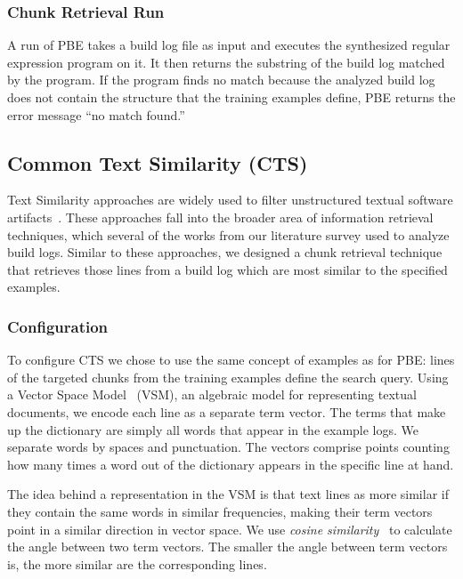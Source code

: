 \documentclass[10pt,journal,compsoc]{IEEEtran}
\begin{document}
\subsubsection{Chunk Retrieval Run}
A run of PBE takes a build log file as input and executes the
synthesized regular expression program on it.
It then returns the substring
of the build log matched by the program.
If the program finds no match because the analyzed build log
does not contain the structure that the training examples define,
PBE returns the error message ``no match found.''

\subsection{Common Text Similarity (CTS)}
Text Similarity approaches are widely used to filter unstructured
textual software artifacts~\cite{runeson2007detection,
marcus2005recovery,antoniol2002recovering,mccarey2006recommending}.
These approaches fall into the broader area of information retrieval
techniques, which several of the works from our literature survey
used to analyze build logs.
Similar to these approaches, we designed a chunk retrieval
technique that
retrieves those lines from a build log which are most
similar to the specified examples.

\subsubsection{Configuration}
To configure CTS we chose to use the same concept of examples as for
PBE: lines of the targeted chunks from the training examples define
the search query.
Using a Vector Space
Model~\cite{schutze2008introduction} (VSM), an algebraic model for
representing textual documents, we encode each line as a separate term
vector.
The terms that make up the dictionary are simply all words
that appear in the example logs.
We separate words by spaces and
punctuation.
The vectors comprise points counting
how many times a word out of the dictionary appears in the specific
line at hand.

The idea behind a representation in the VSM is that text lines as more
similar if they contain the same words in similar frequencies,
making their term vectors point in a similar direction in vector
space.
We use \emph{cosine similarity}~\cite{korenius2007principal}
to calculate the angle between two term vectors.
The smaller the
angle between term vectors is, the more similar are the corresponding
lines.
\end{document}
